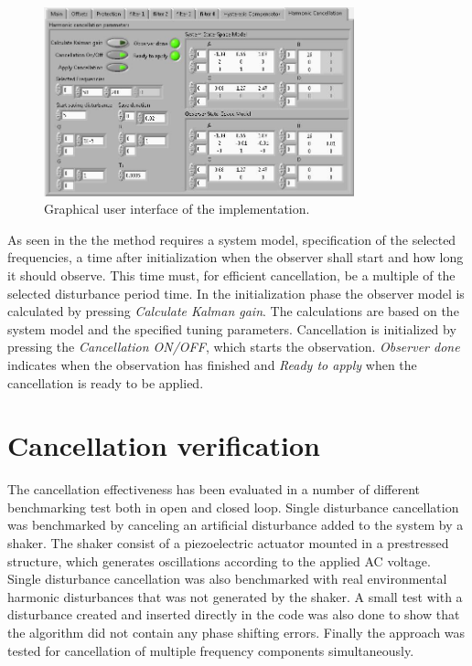 \begin{figure}[h]
  \centering %
  \includegraphics[width=0.8\textwidth]{fig/HC_gui}
  \caption{\label{fig:gui}Graphical user interface of the \abbrRFDC implementation.}
\end{figure}

As seen in the \abbrGUI the method requires a system model, specification of the selected frequencies, a time after initialization when the observer shall start and how long it should observe. This time must, for efficient cancellation, be a multiple of the selected disturbance period time. In the initialization phase the observer model is calculated by pressing \emph{Calculate Kalman gain}. The calculations are based on the system model and the specified tuning parameters. Cancellation is initialized by pressing the \emph{Cancellation ON/OFF}, which starts the observation. \emph{Observer done} indicates when the observation has finished and \emph{Ready to apply} when the cancellation is ready to be applied.

\section{Cancellation verification}
The cancellation effectiveness has been evaluated in a number of different benchmarking test both in open and closed loop. Single disturbance cancellation was benchmarked by canceling an artificial disturbance added to the system by a shaker. The shaker consist of a piezoelectric actuator mounted in a prestressed structure, which generates oscillations according to the applied AC voltage. Single disturbance cancellation was also benchmarked with real environmental harmonic disturbances that was not generated by the shaker. A small test with a disturbance created and inserted directly in the code was also done to show that the algorithm did not contain any phase shifting errors. Finally the approach was tested for cancellation of multiple frequency components simultaneously.

